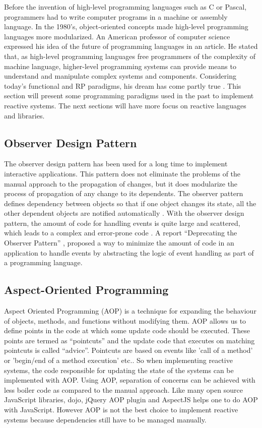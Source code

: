 Before the invention of high-level programming languages such as C or Pascal, programmers had to write computer programs in a machine or assembly language. In the 1980's, object-oriented concepts made high-level programming languages more modularized. An American professor of computer science expressed his idea of the future of programming languages in an article. He stated that, as high-level programming languages free programmers of the complexity of machine language, higher-level programming systems can provide means to understand and manipulate complex systems and components. Considering today's functional and RP paradigms, his dream has come partly true \cite{Winograd:1979:BPL:359131.359133}.
This section will present some programming paradigms used in the past to implement reactive systems. The next sections will have more focus on reactive languages and libraries.
\fi

\subsection{Observer Design Pattern}
The observer design pattern has been used for a long time to implement interactive applications. This pattern does not eliminate the problems of the manual approach to the propagation of changes, but it does modularize the process of propagation of any change to its dependents. The observer pattern defines dependency between objects so that if one object changes its state, all the other dependent objects are notified automatically \cite{Gamma:1995:DPE:186897}. With the observer design pattern, the amount of code for handling events is quite large and scattered, which leads to a complex and error-prone code \cite{Meyerovich:2009:FPL:1639949.1640091}. A report ``Deprecating the Observer Pattern'' \cite{EPFL-REPORT-176887}, proposed a way to minimize the amount of code in an application to handle events by abstracting the logic of event handling as part of a programming language.

\subsection{Aspect-Oriented Programming} \label{subsec:AOP}
Aspect Oriented Programming (AOP) is a technique for expanding the behaviour of objects, methods, and functions without modifying them. AOP allows us to define points in the code at which some update code should be executed. These points are termed as ``pointcuts'' and the update code that executes on matching pointcuts is called ``advice''. Pointcuts are based on events like 'call of a method' or 'begin/end of a method execution' etc.. So when implementing reactive systems, the code responsible for updating the state of the systems can be implemented with AOP. Using AOP, separation of concerns can be achieved with less boiler code as compared to the manual approach. Like many open source JavaScript libraries, dojo\cite{dojo}, jQuery AOP plugin\cite{jqueryaop} and AspectJS\cite{AspectJs} helps one to do AOP with JavaScript. However AOP is not the best choice to implement reactive systems because dependencies still have to be managed manually.

